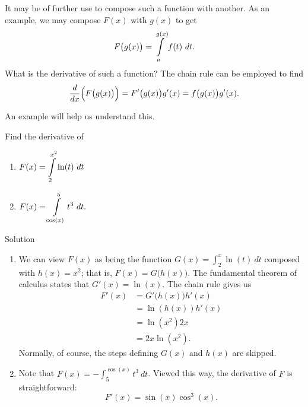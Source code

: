 It may be of further use to compose such a function with another. As an example, we may compose $F(x)$ with $g(x)$ to get $$F\big(g(x)\big) = \displaystyle \int\limits_a^{g(x)} f(t)\ dt.$$ What is the derivative of such a function? 
The chain rule can be employed to find $$\frac{d}{dx}\Big(F\big(g(x)\big)\Big) = F'\big(g(x)\big)g'(x) = f\big(g(x)\big)g'(x).$$

An example will help us understand this.


\begin{example}\label{ex_ftc11}
Find the derivative of 
\begin{multicols}{2}
\begin{enumerate}
    \item $\displaystyle F(x) = \displaystyle \int\limits_2^{x^2} \ln (t)\ dt$
    \item $\displaystyle F(x) = \displaystyle \int\limits_{\cos (x)}^5 t^3\ dt.$
\end{enumerate}
\end{multicols}

\ifcalculus\pagebreak\fi
{}Solution 

\begin{enumerate}
\item We can view $F(x)$ as being the function $ G(x) = \int_2^x \ln(t)\ dt$ composed with $h(x) = x^2$; that is, $F(x) = G\big(h(x)\big)$. The fundamental theorem of calculus states that $G'(x) = \ln (x)$. The chain rule gives us 
\begin{align*}
F'(x) &= G'\big(h(x)\big) h'(x) \\
 			&= \ln (h(x)) h'(x) \\
 			&= \ln (x^2) 2x \\
 			&=2x\ln (x^2).
\end{align*}
Normally, of course, the steps defining $G(x)$ and $h(x)$ are skipped.
\item Note that $ F(x) = -\int_5^{\cos (x)} t^3\ dt$. Viewed this way, the derivative of $F$ is straightforward:
$$F'(x) = \sin (x) \cos^3 (x).$$
\end{enumerate}
\end{example}
%
